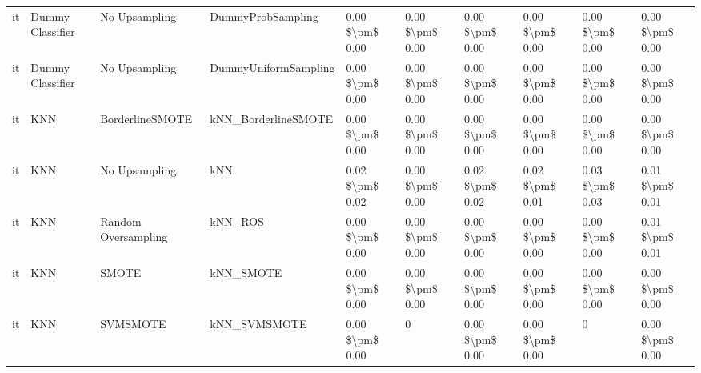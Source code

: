 \begin{tabular}{llllllllll}
      it &                Dummy Classifier &                 No Upsampling &                            DummyProbSampling & 0.00 \$\textbackslash pm\$ 0.00 &           0.00 \$\textbackslash pm\$ 0.00 &       0.00 \$\textbackslash pm\$ 0.00 &        0.00 \$\textbackslash pm\$ 0.00 &                         0.00 \$\textbackslash pm\$ 0.00 &     0.00 \$\textbackslash pm\$ 0.00 \\
      it &                Dummy Classifier &                 No Upsampling &                         DummyUniformSampling & 0.00 \$\textbackslash pm\$ 0.00 &           0.00 \$\textbackslash pm\$ 0.00 &       0.00 \$\textbackslash pm\$ 0.00 &        0.00 \$\textbackslash pm\$ 0.00 &                         0.00 \$\textbackslash pm\$ 0.00 &     0.00 \$\textbackslash pm\$ 0.00 \\
      it &                             KNN &               BorderlineSMOTE &                          kNN\_BorderlineSMOTE & 0.00 \$\textbackslash pm\$ 0.00 &           0.00 \$\textbackslash pm\$ 0.00 &       0.00 \$\textbackslash pm\$ 0.00 &        0.00 \$\textbackslash pm\$ 0.00 &                         0.00 \$\textbackslash pm\$ 0.00 &     0.00 \$\textbackslash pm\$ 0.00 \\
      it &                             KNN &                 No Upsampling &                                          kNN & 0.02 \$\textbackslash pm\$ 0.02 &           0.00 \$\textbackslash pm\$ 0.00 &       0.02 \$\textbackslash pm\$ 0.02 &        0.02 \$\textbackslash pm\$ 0.01 &                         0.03 \$\textbackslash pm\$ 0.03 &     0.01 \$\textbackslash pm\$ 0.01 \\
      it &                             KNN &           Random Oversampling &                                      kNN\_ROS & 0.00 \$\textbackslash pm\$ 0.00 &           0.00 \$\textbackslash pm\$ 0.00 &       0.00 \$\textbackslash pm\$ 0.00 &        0.00 \$\textbackslash pm\$ 0.00 &                         0.00 \$\textbackslash pm\$ 0.00 &     0.01 \$\textbackslash pm\$ 0.01 \\
      it &                             KNN &                         SMOTE &                                    kNN\_SMOTE & 0.00 \$\textbackslash pm\$ 0.00 &           0.00 \$\textbackslash pm\$ 0.00 &       0.00 \$\textbackslash pm\$ 0.00 &        0.00 \$\textbackslash pm\$ 0.00 &                         0.00 \$\textbackslash pm\$ 0.00 &     0.00 \$\textbackslash pm\$ 0.00 \\
      it &                             KNN &                      SVMSMOTE &                                 kNN\_SVMSMOTE & 0.00 \$\textbackslash pm\$ 0.00 &                         0 &       0.00 \$\textbackslash pm\$ 0.00 &        0.00 \$\textbackslash pm\$ 0.00 &                                       0 &     0.00 \$\textbackslash pm\$ 0.00 \\

\end{tabular}
